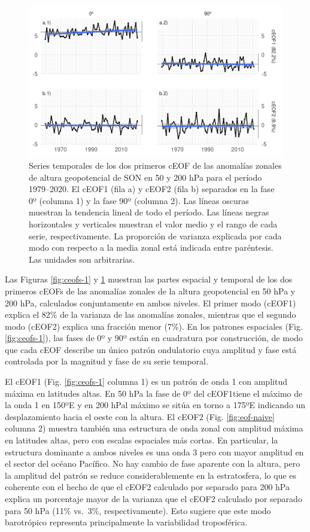 \documentclass[12pt,oneside]{reedthesis}
\begin{document}
\begin{figure}
\includegraphics{figures/20-ceofs/extended-series-1} \caption{Series temporales de los dos primeros cEOF de las anomalías zonales de altura geopotencial de SON en 50 y 200 hPa para el período 1979--2020. El cEOF1 (fila a) y cEOF2 (fila b) separados en la fase 0º (columna 1) y la fase 90º (columna 2). Las líneas oscuras muestran la tendencia lineal de todo el período. Las líneas negras horizontales y verticales muestran el valor medio y el rango de cada serie, respectivamente. La proporción de varianza explicada por cada modo con respecto a la media zonal está indicada entre paréntesis. Las unidades son arbitrarias.}\label{fig:extended-series}
\end{figure}

Las Figuras \ref{fig:ceofs-1} y \ref{fig:extended-series} muestran las partes espacial y temporal de los dos primeros cEOFs de las anomalías zonales de la altura geopotencial en 50 hPa y 200 hPa, calculados conjuntamente en ambos niveles.
El primer modo (cEOF1) explica el 82\% de la varianza de las anomalías zonales, mientras que el segundo modo (cEOF2) explica una fracción menor (7\%).
En los patrones espaciales (Fig. \ref{fig:ceofs-1}), las fases de 0º y 90º están en cuadratura por construcción, de modo que cada cEOF describe un único patrón ondulatorio cuya amplitud y fase está controlada por la magnitud y fase de su serie temporal.

El cEOF1 (Fig. \ref{fig:ceofs-1} columna 1) es un patrón de onda 1 con amplitud máxima en latitudes altas.
En 50 hPa la fase de 0º del cEOF1tiene el máximo de la onda 1 en 150ºE y en 200 hPal máximo se sitúa en torno a 175ºE indicando un desplazamiento hacia el oeste con la altura.
El cEOF2 (Fig. \ref{fig:eof-naive} columna 2) muestra también una estructura de onda zonal con amplitud máxima en latitudes altas, pero con escalas espaciales más cortas.
En particular, la estructura dominante a ambos niveles es una onda 3 pero con mayor amplitud en el sector del océano Pacífico.
No hay cambio de fase aparente con la altura, pero la amplitud del patrón se reduce considerablemente en la estratosfera, lo que es coherente con el hecho de que el cEOF2 calculado por separado para 200 hPa explica un porcentaje mayor de la varianza que el cEOF2 calculado por separado para 50 hPa (11\% vs.~3\%, respectivamente).
Esto sugiere que este modo barotrópico representa principalmente la variabilidad troposférica.
\end{document}

